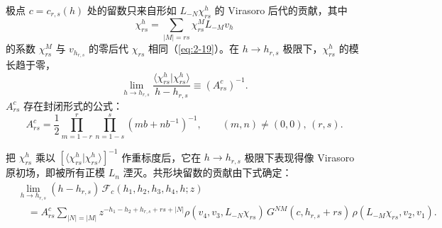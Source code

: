 
极点 $c=c_{r,s}(h)$ 处的留数只来自形如 $L_{-N}\chi^h_{rs}$ 的 Virasoro 后代的贡献，其中
\begin{equation}\label{eq:3-16}
  \chi^h_{rs}=\sum_{|M|=rs}\chi^M_{rs}L_{-M}v_h
\end{equation}
的系数 $\chi^M_{rs}$ 与 $v_{h_{r,s}}$ 的零后代 $\chi_{rs}$ 相同（\eqref{eq:2-19}）。在 $h\to h_{r,s}$ 极限下，$\chi^h_{rs}$ 的模长趋于零，
\begin{equation}\label{eq:3-17}
  \lim_{h\to h_{r,s}}\frac{\langle\chi^h_{rs}|\chi^h_{rs}\rangle}{h-h_{r,s}}
  \equiv (A^c_{rs})^{-1}.
\end{equation}
$A^c_{rs}$ 存在封闭形式的公式：
\begin{equation}\label{eq:3-18}
  A^c_{rs}=\frac12\prod_{m=1-r}^{r}\prod_{n=1-s}^{s}(mb+nb^{-1})^{-1},
  \qquad (m,n)\neq(0,0),\,(r,s).
\end{equation}


把 $\chi^h_{rs}$ 乘以 $[\langle\chi^h_{rs}|\chi^h_{rs}\rangle]^{-1}$ 作重标度后，它在 $h\to h_{r,s}$ 极限下表现得像 Virasoro 原初场，即被所有正模 $L_n$ 湮灭。共形块留数的贡献由下式确定：
\begin{equation}\label{eq:3-19}
  \begin{aligned}
    &\lim_{h\to h_{r,s}}(h-h_{r,s})\,\mathcal F_c(h_1,h_2,h_3,h_4,h;z)\\
    &\quad=A^c_{rs}\sum_{|N|=|M|}
      z^{-h_1-h_2+h_{r,s}+rs+|N|}
      \rho(v_4,v_3,L_{-N}\chi_{rs})\,
      G^{NM}(c,h_{r,s}+rs)\,\rho(L_{-M}\chi_{rs},v_2,v_1).
  \end{aligned}
\end{equation}

